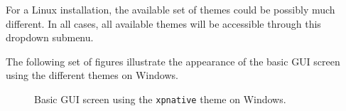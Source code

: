 \documentclass[a4paper]{article}
\begin{document}
For a Linux installation, the available set of themes could be possibly much different. In all cases, all available themes will be accessible through this dropdown submenu.

The following set of figures illustrate the appearance of the basic GUI screen using the different themes on Windows.
\begin{figure}
\label{hercules-gui-basicscreen-xpnative}
\noindent{}
\caption{Basic GUI screen using the \texttt{xpnative} theme on Windows.}
\end{figure}
\end{document}
